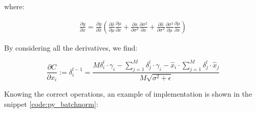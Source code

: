\documentclass[12pt,a4paper]{report}
\begin{document}
where: 

\begin{align}
 \frac{\partial y}{\partial x} = \frac{\partial y}{\partial \hat x} 
 (\frac{\partial \hat x}{\partial \mu}\frac{\partial \mu}{\partial x} + 
  \frac{\partial \hat x}{\partial \sigma^2}\frac{\partial \sigma^2}{\partial x} +
\frac{\partial \hat x}{\partial \sigma^2}\frac{\partial \sigma^2}{\partial \mu}\frac{\partial \mu}{\partial x})
\end{align}

By considering all the derivatives, we find:

\begin{equation}
 \frac{\partial C}{\partial x_i} := \delta^{l-1}_i = 
 \frac{M\delta^l_i \cdot \gamma_i - \sum_{j=1}^{M} \delta^l_j \cdot \gamma_i - \hat x_i \cdot \sum_{j=1}^{M} \delta^l_j \cdot \hat x_j}
 {M\sqrt{\sigma^2 + \epsilon}}
\end{equation}

Knowing the correct operations, an example of implementation is shown in the snippet \ref{code:py_batchnorm}: 
\end{document}
